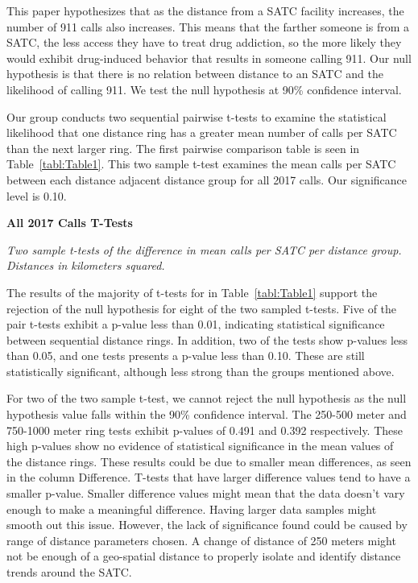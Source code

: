 \documentclass[12pt]{article}
\begin{document}
This paper hypothesizes that as the distance from a SATC facility increases, the number of 911 calls also increases. This means that the farther someone is from a SATC, the less access they have to treat drug addiction, so the more likely they would exhibit drug-induced behavior that results in someone calling 911. Our null hypothesis is that there is no relation between distance to an SATC and the likelihood of calling 911. We test the null hypothesis at 90\% confidence interval. 

Our group conducts two sequential pairwise t-tests to examine the statistical likelihood that one distance ring has a greater mean number of calls per SATC than the next larger ring. The first pairwise comparison table is seen in Table~\ref{tabl:Table1}. This two sample t-test examines the mean calls per SATC between each distance adjacent distance group for all 2017 calls. Our significance level is 0.10.

\begin{table}[htbp]
\begin{center}

\end{center}

\caption{\textbf{All 2017 Calls T-Tests}}
\label{tabl:Table1}
\centering\textit{Two sample t-tests of the difference in mean calls per SATC per distance group.}
\textit{Distances in kilometers squared.}
\end{table}


The results of the majority of t-tests for in Table~\ref{tabl:Table1} support the rejection of the null hypothesis for eight of the two sampled t-tests. Five of the pair t-tests exhibit a p-value less than 0.01, indicating statistical significance between sequential distance rings. In addition, two of the tests show p-values less than 0.05, and one tests presents a p-value less than 0.10. These are still statistically significant, although less strong than the groups mentioned above. 

For two of the two sample t-test, we cannot reject the null hypothesis as the null hypothesis value falls within the 90\% confidence interval. The 250-500 meter and 750-1000 meter ring tests exhibit p-values of 0.491 and 0.392 respectively. These high p-values show no evidence of statistical significance in the mean values of the distance rings. These results could be due to smaller mean differences, as seen in the column Difference. T-tests that have larger difference values tend to have a smaller p-value. Smaller difference values might mean that the data doesn't vary enough to make a meaningful difference. Having larger data samples might smooth out this issue. However, the lack of significance found could be caused by range of distance parameters chosen. A change of distance of 250 meters might not be enough of a geo-spatial distance to properly isolate and identify distance trends around the SATC.
\end{document}

